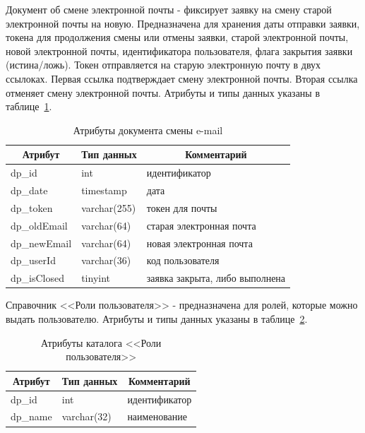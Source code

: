Документ об смене электронной почты - фиксирует заявку на смену старой электронной почты на новую.
Предназначена для хранения даты отправки заявки, токена для продолжения смены или отмены заявки,
старой электронной почты, новой электронной почты,
идентификатора пользователя, флага закрытия заявки (истина/ложь).
Токен отправляется на старую электронную почту в двух ссылоках.
Первая ссылка подтверждает смену электронной почты.
Вторая ссылка отменяет смену электронной почты.
Атрибуты и типы данных указаны в таблице~\ref{tab:DP_DOC_ChangeEmail}.

\begin{table}[!htb]
    \centering\small

    \caption{Атрибуты документа смены e-mail}
    \label{tab:DP_DOC_ChangeEmail}

    \begin{tabular}{|p{5cm}|p{2.5cm}|p{9cm}|}
        \hline
        \multicolumn{1}{|c|}{Атрибут}
        & \multicolumn{1}{c|}{Тип данных}
        & \multicolumn{1}{c|}{Комментарий}
        \\ \hline

        dp\_id & int & идентификатор \\ \hline
        dp\_date & timestamp & дата \\ \hline
        dp\_token & varchar(255) & токен для почты \\ \hline
        dp\_oldEmail & varchar(64) & старая электронная почта \\ \hline
        dp\_newEmail & varchar(64) & новая электронная почта \\ \hline
        dp\_userId & varchar(36) & код пользователя \\ \hline
        dp\_isClosed & tinyint & заявка закрыта, либо выполнена \\ \hline
    \end{tabular}
\end{table}

Справочник <<Роли пользователя>> - предназначена для ролей, которые можно выдать пользователю.
Атрибуты и типы данных указаны в таблице~\ref{tab:DP_CTL_Roles}.

\begin{table}[!htb]
    \centering\small

    \caption{Атрибуты каталога <<Роли пользователя>>}
    \label{tab:DP_CTL_Roles}

    \begin{tabular}{|p{5cm}|p{2.5cm}|p{9cm}|}
        \hline
        \multicolumn{1}{|c|}{Атрибут}
        & \multicolumn{1}{c|}{Тип данных}
        & \multicolumn{1}{c|}{Комментарий}
        \\ \hline

        dp\_id & int & идентификатор \\ \hline
        dp\_name & varchar(32) & наименование \\ \hline
    \end{tabular}
\end{table}

